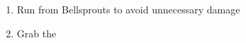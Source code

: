 \begin{paracol}{2}
\begin{enumerate}[resume]
	\item Run from Bellsprouts to avoid unnecessary damage
	\item Grab the 
\end{enumerate}

\end{paracol}
\vspace{3.5mm}